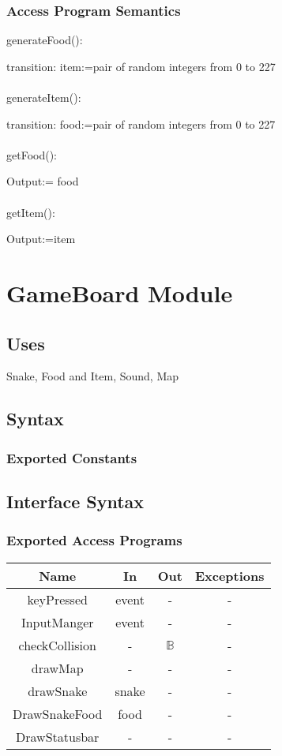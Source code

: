 \documentclass[12pt, titlepage]{article}
\begin{document}
		\subsubsection{Access Program Semantics}
		generateFood():
		
        transition: item:=pair of random integers from 0 to 227\\
		\\
		generateItem():
		
        transition: food:=pair of random integers from 0 to 227\\
        \\
		getFood():
		
		Output:= food\\
		\\
		getItem():
		

		Output:=item
		\\
	

\section{GameBoard Module}
\subsection* {Uses}
Snake, Food and Item, Sound, Map
\subsection* {Syntax}
\subsubsection* {Exported Constants}
		\subsection{Interface Syntax}
		\subsubsection{Exported Access Programs}
		\begin{tabular}[pos]{|c|c|c|c|}
			\hline
			\textbf{Name}& \textbf{In} & \textbf{Out} & \textbf{Exceptions} \\ \hline
			 keyPressed & event & - & - \\ \hline
			 InputManger & event  & - & - \\ \hline
			 checkCollision & -  & $\mathbb{B}$ & - \\ \hline
			 drawMap & -  & - & - \\ \hline
			 drawSnake  & snake  & - & - \\ \hline
			 DrawSnakeFood & food  & - & - \\ \hline
			 DrawStatusbar & -  & - & - \\ \hline
			
		\end{tabular}
		
\end{document}
